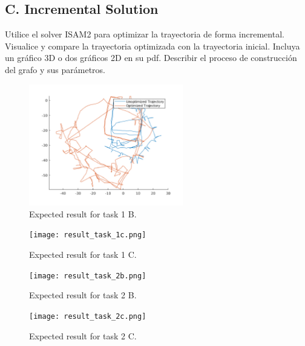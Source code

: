 \documentclass[tp]{lcc}
\begin{document}
\subsection{C. Incremental Solution}
Utilice el solver ISAM2 para optimizar la trayectoria de forma incremental. Visualice y compare la trayectoria optimizada con la trayectoria inicial. Incluya un gráfico 3D o dos gráficos 2D en su pdf. Describir el proceso de construcción del grafo y sus parámetros.

\begin{figure}[!htbp]
    \centering
    \includegraphics[width=0.6\textwidth]{images/result_task_1b.png}
    \caption{Expected result for task 1 B.}
    \label{fig:task1b}
\end{figure}

\begin{figure}[!htbp]
    \centering
    \texttt{[image: result\_task\_1c.png]}
    \caption{Expected result for task 1 C.}
    \label{fig:task1c}
\end{figure}

\begin{figure}[!htbp]
    \centering
    \texttt{[image: result\_task\_2b.png]}
    \caption{Expected result for task 2 B.}
    \label{fig:task2b}
\end{figure}

\begin{figure}[!htbp]
    \centering
    \texttt{[image: result\_task\_2c.png]}
    \caption{Expected result for task 2 C.}
    \label{fig:task2c}
\end{figure}
\end{document}
